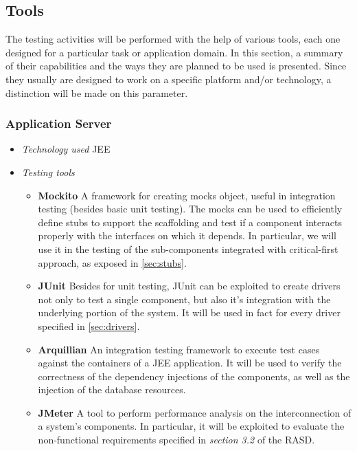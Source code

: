 \subsection{Tools}
	The testing activities will be performed with the help of various tools, each one designed for a particular task or application domain. In this section, a summary of their capabilities and the ways they are planned to be used is presented. Since they usually are designed to work on a specific platform and/or technology, a distinction will be made on this parameter.

	\subsubsection*{Application Server}
		\begin{itemize}[label={},leftmargin=*,noitemsep,topsep=0pt]
			\item \textit{Technology used} JEE
			\item \textit{Testing tools}
				\begin{itemize}[label={},noitemsep]
					\item \textbf{Mockito} A framework for creating mocks object, useful in integration testing (besides basic unit testing). The mocks can be used to efficiently define stubs to support the scaffolding and test if a component interacts properly with the interfaces on which it depends. In particular, we will use it in the testing of the sub-components integrated with critical-first approach, as exposed in \autoref{sec:stubs}.
					\item \textbf{JUnit} Besides for unit testing, JUnit can be exploited to create drivers not only to test a single component, but also it's integration with the underlying portion of the system. It will be used in fact for every driver specified in \autoref{sec:drivers}.
					\item \textbf{Arquillian} An integration testing framework to execute test cases against the containers of a JEE application. It will be used to verify the correctness of the dependency injections of the components, as well as the injection of the database resources.
					\item \textbf{JMeter} A tool to perform performance analysis on the interconnection of a system's components. In particular, it will be exploited to evaluate the non-functional requirements specified in \textit{section 3.2} of the RASD.
				\end{itemize}
		\end{itemize}

